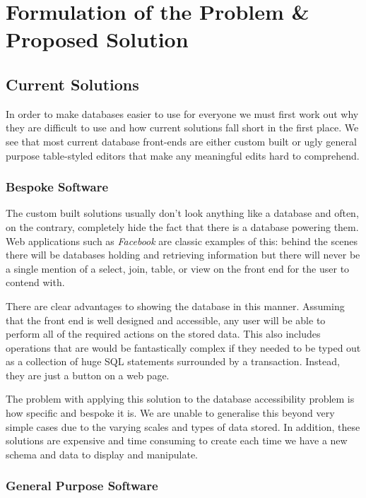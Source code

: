 \chapter{Formulation of the Problem \& Proposed Solution}

\section{Current Solutions}

In order to make databases easier to use for everyone we must first work out why they are difficult to use and how current solutions fall short in the first place. We see that most current database front-ends are either custom built or ugly general purpose table-styled editors that make any meaningful edits hard to comprehend.

\subsection{Bespoke Software}

The custom built solutions usually don't look anything like a database and often, on the contrary, completely hide the fact that there is a database powering them. Web applications such as \emph{Facebook} are classic examples of this: behind the scenes there will be databases holding and retrieving information but there will never be a single mention of a select, join, table, or view on the front end for the user to contend with.

There are clear advantages to showing the database in this manner. Assuming that the front end is well designed and accessible, any user will be able to perform all of the required actions on the stored data. This also includes operations that are would be fantastically complex if they needed to be typed out as a collection of huge \ac{SQL} statements surrounded by a transaction. Instead, they are just a button on a web page.

The problem with applying this solution to the database accessibility problem is how specific and bespoke it is. We are unable to generalise this beyond very simple cases due to the varying scales and types of data stored. In addition, these solutions are expensive and time consuming to create each time we have a new schema and data to display and manipulate.

\subsection{General Purpose Software}

